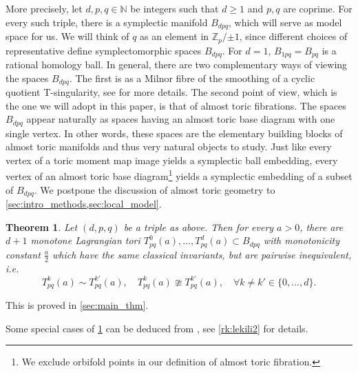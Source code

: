 \documentclass[AIF,Unicode,manuscript]{cedram}
\newtheorem{maintheorem}{Theorem}
\begin{document}
More precisely, let $d,p,q \in \mathbb{N}$ be integers such that $d≥1$ and $p,q$ are coprime.
For every such triple, there is a symplectic manifold $B_{dpq}$, which will serve as model space for us. 
We will think of $q$ as an element in $ℤ_p / {±1}$, since different choices of representative define symplectomorphic spaces $B_{dpq}$.
For $d=1$, $B_{1pq} = B_{pq}$ is a rational homology ball.
In general, there are two complementary ways of viewing the spaces $B_{dpq}$.
The first is as a Milnor fibre of the smoothing of a cyclic quotient T-singularity, see \cite[Section 7.4]{evans2021atfs} for more details.
The second point of view, which is the one we will adopt in this paper, is that of almost toric fibrations.
The spaces $B_{dpq}$ appear naturally as spaces having an almost toric base diagram with one single vertex.
In other words, these spaces are the elementary building blocks of almost toric manifolds and thus very natural objects to study.
Just like every vertex of a toric moment map image yields a symplectic ball embedding, every vertex of an almost toric base diagram\footnote{We exclude orbifold points in our definition of almost toric fibration.} yields a symplectic embedding of a subset of $B_{dpq}$.
We postpone the discussion of almost toric geometry to \cref{sec:intro_methods,sec:local_model}. 

\begin{maintheorem}
    \label{thm:A}
    Let $(d,p,q)$ be a triple as above.
Then for every $a>0$, there are $d+1$ monotone Lagrangian tori $T^0_{pq}(a), \ldots , T^d_{pq}(a) \subset B_{dpq}$ with monotonicity constant $\frac{a}{2}$ which have the same classical invariants, but are pairwise inequivalent, i.e.\ 
    \begin{equation}
        T^k_{pq}(a) \sim T^{k'}_{pq}(a), \quad 
         T^k_{pq}(a) \ncong T^{k'}_{pq}(a), \quad
        \forall k \neq k' \in \{0,\ldots,d\}.
    \end{equation}
\end{maintheorem}

This is proved in \cref{sec:main_thm}.

\begin{remark}
    \label{rk:lekili}
    Some special cases of \cref{thm:A} can be deduced from \cite{LekMay14}, see \cref{rk:lekili2} for details.
\end{remark}
\end{document}
